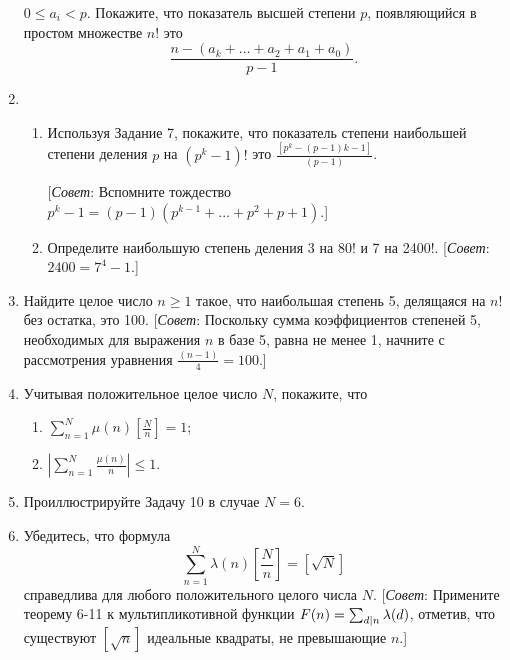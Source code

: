 \documentclass[11pt]{article}
\begin{document}
\begin{enumerate}
	$ 0\le a_{i}<p $. Покажите, что показатель высшей степени $ p $, появляющийся в простом множестве $ n! $ это
	$$ \frac{n-\left( a_{k}+...+ a_{2}+a_{1}+a_{0}\right) }{p-1}. $$
	\item 
		\begin{enumerate}
			\item Используя Задание 7, покажите, что показатель степени наибольшей степени деления $ p $ на $ \left( p^{k}-1\right) ! $ это $ \frac{\left[ p^{k}-\left( p-1\right)k-1\right]   }{\left( p-1\right) } $. 
			
			[\textit{Совет}: Вспомните тождество $ p^{k}-1=\left( p-1\right) \left( p^{k-1}+...+p^{2}+p+1\right)  $.]
			\item Определите наибольшую степень деления 3 на 80! и 7 на 2400!. [\textit{Совет}: $2400=7^{4}-1$.]
		\end{enumerate}	
	\item Найдите целое число $ n\ge1 $ такое, что наибольшая степень 5, делящаяся на $ n! $ без остатка, это 100. [\textit{Совет}: Поскольку сумма коэффициентов степеней 5, необходимых для выражения $ n $ в базе 5, равна не менее 1, начните с рассмотрения уравнения $ \frac{\left( n-1\right) }{4}=100 $.]
	\item Учитывая положительное целое число $ N $, покажите, что 
		\begin{enumerate}
			\item $\sum\limits_{n=1}^{N}\mu(n)\left[ \frac{N}{n} \right] =1 $;
			\item $\left|\sum\limits_{n=1}^{N}\frac{\mu(n)}{n}\right| \le1 $.
		\end{enumerate}	
	\item Проиллюстрируйте Задачу 10 в случае $ N=6 $.
	\item Убедитесь, что формула 
	$$ \sum_{n=1}^{N}\lambda(n)\left[ \frac{N}{n}\right] =\left[ \sqrt{N}\right]  $$
	справедлива для любого положительного целого числа $ N $. [\textit{Совет}: Примените теорему 6-11 к мультипликотивной функции $ F(n)=\sum_{\tiny d|n}\lambda(d) $, отметив, что существуют $ \left[ \sqrt{n}\right]  $ идеальные квадраты, не превышающие $ n $.]
\end{enumerate}
\end{document}
